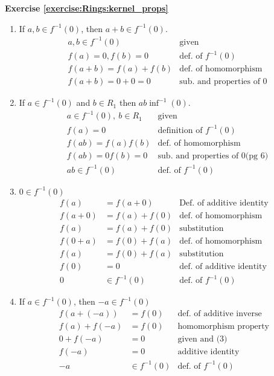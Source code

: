 \noindent\textbf{Exercise \ref{exercise:Rings:kernel_props}}
\begin{enumerate}
\item If $a,b\in f^{-1}(0)$, then $a+b\in f^{-1}(0)$.
\begin{align*}
&a,b\in f^{-1}(0) & \text{given}\\
&f(a)=0,f(b)=0 & \text{def. of $f^{-1}(0)$}\\
&f(a+b)=f(a)+f(b) & \text{def. of homomorphism}\\
&f(a+b)=0+0=0 & \text{sub. and properties of 0}
\end{align*}
\item If $a\in f^{-1}(0)$ and $b\in R_1$ then $ab\inf^{-1}(0)$.
\begin{align*}
&a\in f^{-1}(0),~b\in R_1 & \text{given}\\
&f(a)=0 & \text{definition of $f^{-1}(0)$}\\
&f(ab)=f(a)f(b) & \text{def. of homomorphism}\\
&f(ab)=0f(b)=0 & \text{sub. and properties of 0(pg 6)}\\
&ab\in f^{-1}(0) & \text{def. of $f^{-1}(0)$}
\end{align*}
\item $0\in f^{-1}(0)$
\begin{align*}
f(a)&=f(a+0) & \text{Def. of additive identity}\\
f(a+0)&=f(a)+f(0) & \text{def. of homomorphism}\\
f(a)&=f(a)+f(0) & \text{substitution}\\
f(0+a)&=f(0)+f(a) & \text{def. of homomorphism}\\
f(a)&=f(0)+f(a) & \text{substitution}\\
f(0)&=0 & \text{def. of additive identity}\\
0&\in f^{-1}(0) & \text{def. of $f^{-1}(0)$}
\end{align*}
\item If $a\in f^{-1}(0)$, then $-a\in f^{-1}(0)$
\begin{align*}
f(a+(-a))&=f(0) & \text{def. of additive inverse}\\
f(a)+f(-a)&=f(0) & \text{homomorphism property}\\
0+f(-a)&=0 & \text{given and (3)}\\
f(-a)&=0 & \text{additive identity}\\
-a&\in f^{-1}(0) & \text{def. of $f^{-1}(0)$}
\end{align*}
\end{enumerate}


